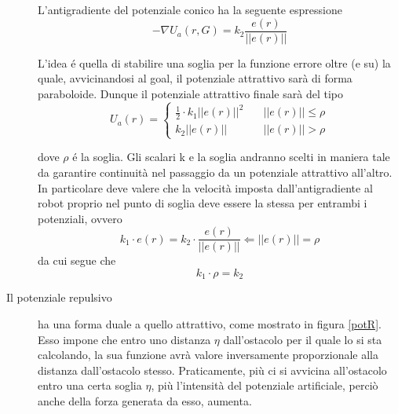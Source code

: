 \documentclass[14pt,a4paper]{extarticle}
\begin{document}
\begin{description}
\begin{figure}[H]
\label{potA}
\end{figure}
L'antigradiente del potenziale conico ha la seguente espressione
\begin{equation}
-\nabla U_a(r,G) = k_2\frac{e(r)}{||e(r)||}
\end{equation}

L'idea é quella di stabilire una soglia per la funzione errore oltre (e su) la quale, avvicinandosi al goal, il potenziale attrattivo sarà di forma paraboloide. 
Dunque il potenziale attrattivo finale sarà del tipo
\begin{equation}
U_a(r) = 
\begin{cases}
\frac{1}{2} \cdot k_1 ||e(r)||^2 \quad &||e(r)|| \leq \rho \\
k_2||e(r)|| \quad &||e(r)|| > \rho
\end{cases}
\end{equation}

dove \(\rho\) é la soglia.  Gli scalari k e la soglia andranno scelti in maniera tale da garantire continuità nel passaggio da un potenziale attrattivo all'altro. In particolare deve valere che la velocità imposta dall'antigradiente al robot proprio nel punto di soglia deve essere la stessa per entrambi i potenziali, ovvero
\[k_1 \cdot e(r) = k_2 \cdot \frac{e(r)}{||e(r)||} \Leftarrow ||e(r)|| = \rho\]
da cui segue che 
\begin{equation}
\label{parconswitch}
k_1 \cdot \rho = k_2 
\end{equation}

\item[Il potenziale repulsivo] ha una forma duale a quello attrattivo, come mostrato in figura \ref{potR}. Esso impone che entro uno distanza \(\eta\) dall'ostacolo per il quale lo si sta calcolando, la sua funzione avrà valore inversamente proporzionale alla distanza dall'ostacolo stesso. Praticamente, più ci si avvicina all'ostacolo entro una certa soglia \(\eta\), più l'intensità del potenziale artificiale, perciò anche della forza generata da esso, aumenta.


\end{description}
\end{document}
